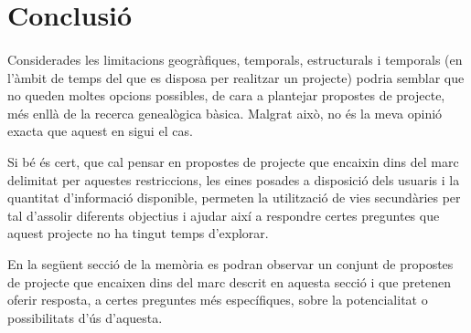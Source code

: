 \section{Conclusió}

    \paragraph{}
    Considerades les limitacions geogràfiques, temporals, estructurals i temporals (en l'àmbit de temps del que es disposa per realitzar un projecte) podria semblar que no queden moltes opcions possibles, de cara a plantejar propostes de projecte, més enllà de la recerca genealògica bàsica. Malgrat això, no és la meva opinió  exacta que aquest en sigui el cas.

    Si bé és cert, que cal pensar en propostes de projecte que encaixin dins del marc delimitat per aquestes restriccions, les eines posades a disposició dels usuaris i la quantitat d'informació disponible, permeten la utilització de vies secundàries per tal d'assolir diferents objectius i ajudar així a respondre certes preguntes que aquest projecte no ha tingut temps d'explorar.

    En la següent secció de la memòria es podran observar un conjunt de propostes de projecte que encaixen dins del marc descrit en aquesta secció i que pretenen oferir resposta, a certes preguntes més específiques, sobre la potencialitat o possibilitats d'ús d'aquesta.
